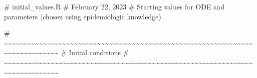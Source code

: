 \documentclass[
  11pt,
  letterpaper,
  DIV=11,
  numbers=noendperiod]{scrartcl}
\newenvironment{Shaded}{\begin{snugshade}}{\end{snugshade}}
\newcommand{\CommentTok}[1]{\textcolor[rgb]{0.37,0.37,0.37}{#1}}
\begin{document}
\begin{Shaded}
\begin{Highlighting}[]
\CommentTok{\# initial\_values.R}
\CommentTok{\# February 22, 2023}
\CommentTok{\# Starting values for ODE and parameters (chosen using epidemiologic knowledge)}

\CommentTok{\# \textasciitilde{}\textasciitilde{}\textasciitilde{}\textasciitilde{}\textasciitilde{}\textasciitilde{}\textasciitilde{}\textasciitilde{}\textasciitilde{}\textasciitilde{}\textasciitilde{}\textasciitilde{}\textasciitilde{}\textasciitilde{}\textasciitilde{}\textasciitilde{}\textasciitilde{}\textasciitilde{}\textasciitilde{}\textasciitilde{}\textasciitilde{}\textasciitilde{}\textasciitilde{}\textasciitilde{}\textasciitilde{}\textasciitilde{}\textasciitilde{}\textasciitilde{}\textasciitilde{}\textasciitilde{}\textasciitilde{}\textasciitilde{}\textasciitilde{}\textasciitilde{}\textasciitilde{}\textasciitilde{}\textasciitilde{}\textasciitilde{}\textasciitilde{}\textasciitilde{}\textasciitilde{}\textasciitilde{}\textasciitilde{}\textasciitilde{}\textasciitilde{}\textasciitilde{}\textasciitilde{}\textasciitilde{}\textasciitilde{}\textasciitilde{}\textasciitilde{}\textasciitilde{}\textasciitilde{}\textasciitilde{}\textasciitilde{}\textasciitilde{}\textasciitilde{}\textasciitilde{}\textasciitilde{}\textasciitilde{}\textasciitilde{}\textasciitilde{}\textasciitilde{}\textasciitilde{}\textasciitilde{}\textasciitilde{}\textasciitilde{}\textasciitilde{}\textasciitilde{}\textasciitilde{}\textasciitilde{}\textasciitilde{}\textasciitilde{}\textasciitilde{}\textasciitilde{}\textasciitilde{}\textasciitilde{}\textasciitilde{}}
\CommentTok{\# Initial conditions}
\CommentTok{\# \textasciitilde{}\textasciitilde{}\textasciitilde{}\textasciitilde{}\textasciitilde{}\textasciitilde{}\textasciitilde{}\textasciitilde{}\textasciitilde{}\textasciitilde{}\textasciitilde{}\textasciitilde{}\textasciitilde{}\textasciitilde{}\textasciitilde{}\textasciitilde{}\textasciitilde{}\textasciitilde{}\textasciitilde{}\textasciitilde{}\textasciitilde{}\textasciitilde{}\textasciitilde{}\textasciitilde{}\textasciitilde{}\textasciitilde{}\textasciitilde{}\textasciitilde{}\textasciitilde{}\textasciitilde{}\textasciitilde{}\textasciitilde{}\textasciitilde{}\textasciitilde{}\textasciitilde{}\textasciitilde{}\textasciitilde{}\textasciitilde{}\textasciitilde{}\textasciitilde{}\textasciitilde{}\textasciitilde{}\textasciitilde{}\textasciitilde{}\textasciitilde{}\textasciitilde{}\textasciitilde{}\textasciitilde{}\textasciitilde{}\textasciitilde{}\textasciitilde{}\textasciitilde{}\textasciitilde{}\textasciitilde{}\textasciitilde{}\textasciitilde{}\textasciitilde{}\textasciitilde{}\textasciitilde{}\textasciitilde{}\textasciitilde{}\textasciitilde{}\textasciitilde{}\textasciitilde{}\textasciitilde{}\textasciitilde{}\textasciitilde{}\textasciitilde{}\textasciitilde{}\textasciitilde{}\textasciitilde{}\textasciitilde{}\textasciitilde{}\textasciitilde{}\textasciitilde{}\textasciitilde{}\textasciitilde{}\textasciitilde{}}

\end{Highlighting}
\end{Shaded}
\end{document}
